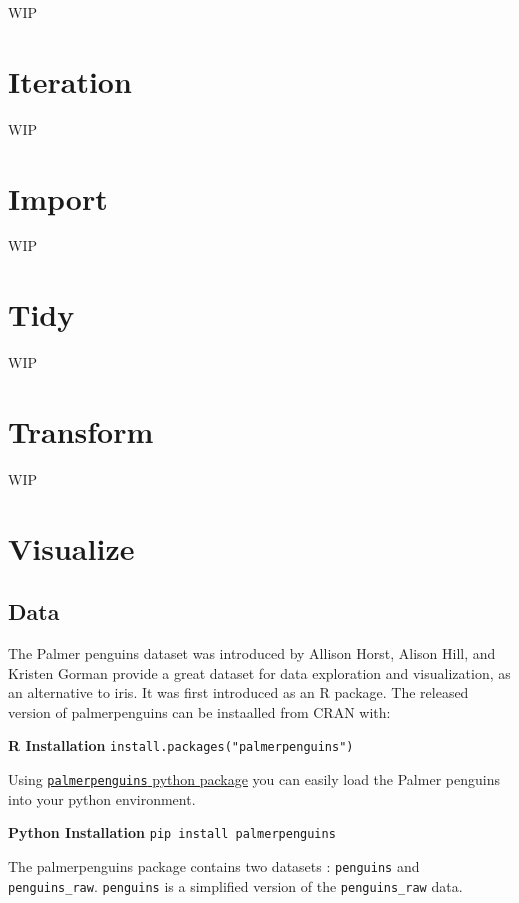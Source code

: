 \documentclass[]{book}
\begin{document}
WIP

\hypertarget{iteration}{%
\chapter{Iteration}\label{iteration}}

WIP

\hypertarget{import}{%
\chapter{Import}\label{import}}

WIP

\hypertarget{tidy}{%
\chapter{Tidy}\label{tidy}}

WIP

\hypertarget{transform}{%
\chapter{Transform}\label{transform}}

WIP

\hypertarget{visualize}{%
\chapter{Visualize}\label{visualize}}

\hypertarget{data}{%
\section{Data}\label{data}}

The Palmer penguins dataset was introduced by Allison Horst, Alison Hill, and Kristen Gorman provide a great dataset for data exploration and visualization, as an alternative to iris. It was first introduced as an R package. The released version of palmerpenguins can be instaalled from CRAN with:

\textbf{R Installation}
\texttt{install.packages("palmerpenguins")}

Using \href{https://pypi.org/project/palmerpenguins/}{\texttt{palmerpenguins} python package} you can easily load the Palmer penguins into your python environment.

\textbf{Python Installation}
\texttt{pip\ install\ palmerpenguins}

The palmerpenguins package contains two datasets : \texttt{penguins} and \texttt{penguins\_raw}. \texttt{penguins} is a simplified version of the \texttt{penguins\_raw} data.
\end{document}
